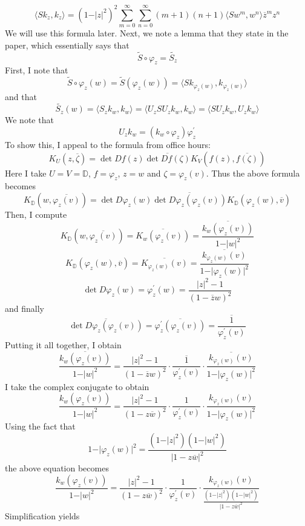 \documentclass[12pt]{article}
\begin{document}
\[
\langle Sk_z, k_z \rangle  = (1-\vert z \vert^2)^2 \sum_{m=0}^\infty \sum_{n=0}^\infty (m+1)(n+1) \langle Sw^m, w^n \rangle \overline{z}^m z^n
\] We will use this formula later. Next, we note a lemma that they state in the paper, which essentially says that
\[
\tilde{S} \circ \varphi_z = \widetilde{S_z}
\]
First, I note that 
\[
\tilde{S} \circ \varphi_z (w) = \tilde{S}(\varphi_z(w)) = \langle Sk_{\varphi_z(w)}, k_{\varphi_z(w)} \rangle
\] and that 
\[
\widetilde{S_z}(w) = \langle S_z k_w, k_w \rangle = \langle U_z S U_z k_w, k_w \rangle = \langle S U_z k_w,  U_z k_w \rangle
\] We note that
\[
U_z k_w = (k_w \circ \varphi_z) \varphi_z^\prime
\]
To show this, I appeal to the formula from office hours: 
\[
K_U(z, \overline{\zeta}) = \det Df(z) \overline{\det Df(\zeta)}  K_V(f(z), \overline{f(\zeta)})
\]
 Here I take $U = V = \mathbb{D}$, $f = \varphi_z$, $z = w$ and $\zeta = \varphi_z(v)$. Thus the above formula becomes 
 \[
 K_\mathbb{D}(w,\overline{\varphi_z(v)}) = \det D \varphi_z(w) \overline{\det D \varphi_z(\varphi_z(v))} K_\mathbb{D}(\varphi_z(w), \overline{v})
 \] Then, I compute 
 \[
 K_\mathbb{D}(w,\overline{\varphi_z(v)}) = \overline{K_w(\varphi_z(v))} = \overline{\frac{k_w(\varphi_z(v))}{1 - \vert w \vert^2}}
 \] 
 \[
 K_\mathbb{D}(\varphi_z(w), \overline{v}) = \overline{K_{\varphi_z(w)}(v)} = \overline{\frac{k_{\varphi_z(w)}(v)}{1- \vert \varphi_z(w) \vert^2}}
 \] 
 \[
 \det D \varphi_z(w) = \varphi_z^\prime(w) = \frac{\vert z \vert^2 - 1}{(1-\overline{z}w)^2}
 \] and finally 
 \[
 \overline{\det D \varphi_z(\varphi_z(v))} = \overline{\varphi_z^\prime(\varphi_z(v))} = \overline{\frac{1}{\varphi_z^\prime(v)}}
 \] Putting it all together, I obtain 
 \[\overline{\frac{k_w(\varphi_z(v))}{1 - \vert w \vert^2}} =  \frac{\vert z \vert^2 - 1}{(1-\overline{z}w)^2} \cdot  \overline{\frac{1}{\varphi_z^\prime(v)}} \cdot  \overline{\frac{k_{\varphi_z(w)}(v)}{1- \vert \varphi_z(w) \vert^2}}
 \] I take the complex conjugate to obtain 
 \[
 \frac{k_w(\varphi_z(v))}{1 - \vert w \vert^2} =  \frac{\vert z \vert^2 - 1}{(1-z\overline{w})^2} \cdot  \frac{1}{\varphi_z^\prime(v)} \cdot  \frac{k_{\varphi_z(w)}(v)}{1- \vert \varphi_z(w) \vert^2}
\] Using the fact that 
\[
1 - \vert \varphi_z(w)\vert^2 = \frac{(1-\vert z \vert^2)(1- \vert w \vert^2)}{\vert 1 - z \overline{w} \vert^2}
\] the above equation becomes 
\[
\frac{k_w(\varphi_z(v))}{1 - \vert w \vert^2} =  \frac{\vert z \vert^2 - 1}{(1-z\overline{w})^2} \cdot  \frac{1}{\varphi_z^\prime(v)} \cdot  \frac{k_{\varphi_z(w)}(v)}{\frac{(1-\vert z \vert^2)(1- \vert w \vert^2)}{\vert 1 - z \overline{w} \vert^2}}
\] Simplification yields 
\end{document}
